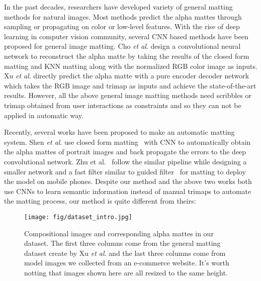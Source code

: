 In the past decades, researchers have developed variety of general matting methods for natural images. Most methods predict the alpha mattes through sampling \cite{chuang2001bayesian,wang2007optimized,gastal2010shared,he2011global,shahrian2013improving} or propagating \cite{sun2004poisson,grady2005random,levin2008closed,chen2013knn,aksoy2017designing} on color or low-level features. With the rise of deep learning in computer vision community, several CNN based methods \cite{cho2016natural,xu2017deep} have been proposed for general image matting. Cho \emph{et al}. \cite{cho2016natural} design a convolutional neural network to reconstruct the alpha matte by taking the results of the closed form matting \cite{levin2008closed} and KNN matting \cite{chen2013knn} along with the normalized RGB color image as inputs. Xu \emph{et al}. \cite{xu2017deep} directly predict the alpha matte with a pure encoder decoder network which takes the RGB image and trimap as inputs and achieve the state-of-the-art results.
However, all the above general image matting methods need scribbles or trimap obtained from user interactions as constraints and so they can not be applied in automatic way.

Recently, several works \cite{shen2016deep,zhu2017fast} have been proposed to make an automatic matting system.
Shen \emph{et al}. \cite{shen2016deep} use closed form matting~\cite{levin2008closed} with CNN to automatically obtain the alpha mattes of portrait images and back propagate the errors to the deep convolutional network. Zhu et al.~\cite{zhu2017fast} follow the similar pipeline while designing a smaller network and a fast filter similar to guided filter~\cite{he2010guided} for matting to deploy the model on mobile phones.
Despite our method and the above two works both use CNNs to learn semantic information instead of manual trimaps to automate the matting process, our method is quite different from theirs:

\begin{figure*}[hbt]
  \texttt{[image: fig/dataset\_intro.jpg]}
  \caption{\label{dataset_intro} Compositional images and corresponding alpha mattes in our dataset. The first three columns come from the general matting dataset create by Xu \emph{et al}. \cite{xu2017deep} and the last three columns come from model images we collected from an e-commerce website. It's worth notting that images shown here are all resized to the same height.}
\end{figure*}

